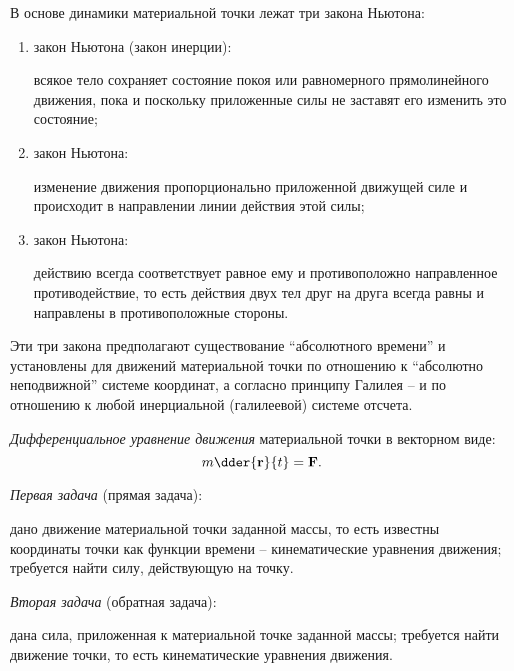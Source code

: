 \renewcommand{\labelenumi}{\Roman{enumi}}


В основе динамики материальной точки лежат три закона Ньютона:
\begin{enumerate}
    \item закон Ньютона (закон инерции):

    всякое тело сохраняет состояние покоя или равномерного прямолинейного
    движения, пока и поскольку приложенные силы не заставят его изменить это
    состояние;
    
    \item закон Ньютона:

    изменение движения пропорционально приложенной движущей силе и происходит
    в направлении линии действия этой силы;

    \item закон Ньютона:
    
    действию всегда соответствует равное ему и противоположно направленное
    противодействие, то есть действия двух тел друг на друга всегда равны и
    направлены в противоположные стороны.

\end{enumerate}
\renewcommand{\labelenumi}{\arabic{enumi}.}

Эти три закона предполагают существование ``абсолютного времени'' и установлены
для движений материальной точки по отношению к ``абсолютно неподвижной'' системе
координат, а согласно принципу Галилея -- и по отношению к любой инерциальной
(галилеевой) системе отсчета.

\emph{Дифференциальное уравнение движения} материальной точки в векторном виде:
\[
    m\dder{\vec{r}}{t} = \vec{F}.
\]

\emph{Первая задача} (прямая задача):
    
дано движение материальной точки заданной массы, то есть известны координаты
точки как функции времени -- кинематические уравнения движения; требуется найти
силу, действующую на точку.

\emph{Вторая задача} (обратная задача):
    
дана сила, приложенная к материальной точке заданной массы; требуется найти
движение точки, то есть кинематические уравнения движения.

\newpage
